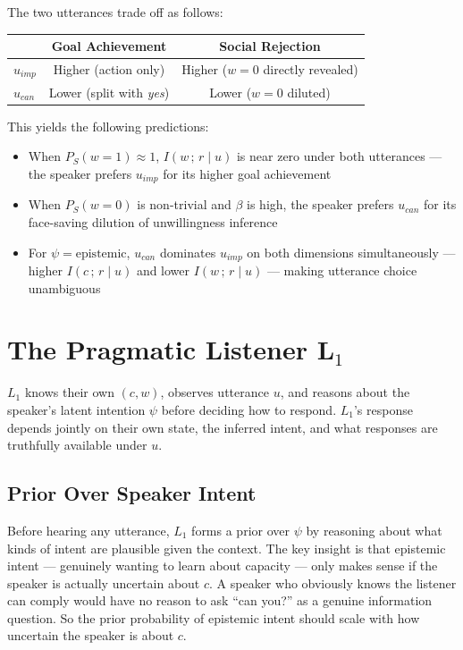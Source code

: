 \documentclass[12pt]{article}
\begin{document}
The two utterances trade off as follows:

\vspace{0.5em}
\begin{center}
\begin{tabular}{lcc}
\toprule
 & Goal Achievement & Social Rejection \\
\midrule
$u_{imp}$ & Higher (action only) & Higher ($w=0$ directly revealed) \\
$u_{can}$ & Lower (split with \textit{yes}) & Lower ($w=0$ diluted) \\
\bottomrule
\end{tabular}
\end{center}
\vspace{0.5em}

This yields the following predictions:

\begin{itemize}
    \item When $P_S(w=1) \approx 1$, $I(w\,;\,r \mid u)$ is near zero
        under both utterances --- the speaker prefers $u_{imp}$ for its
        higher goal achievement
    \item When $P_S(w=0)$ is non-trivial and $\beta$ is high, the
        speaker prefers $u_{can}$ for its face-saving dilution of
        unwillingness inference
    \item For $\psi = \text{epistemic}$, $u_{can}$ dominates $u_{imp}$
        on both dimensions simultaneously --- higher $I(c\,;\,r \mid
        u)$ and lower $I(w\,;\,r \mid u)$ --- making utterance choice
        unambiguous
\end{itemize}

\section{The Pragmatic Listener L$_1$}

$L_1$ knows their own $(c, w)$, observes utterance $u$, and reasons
about the speaker's latent intention $\psi$ before deciding how to
respond. $L_1$'s response depends jointly on their own state, the
inferred intent, and what responses are truthfully available under $u$.

\subsection{Prior Over Speaker Intent}

Before hearing any utterance, $L_1$ forms a prior over $\psi$ by
reasoning about what kinds of intent are plausible given the context.
The key insight is that epistemic intent --- genuinely wanting to learn
about capacity --- only makes sense if the speaker is actually uncertain
about $c$. A speaker who obviously knows the listener can comply would
have no reason to ask ``can you?'' as a genuine information question.
So the prior probability of epistemic intent should scale with how
uncertain the speaker is about $c$.
\end{document}
